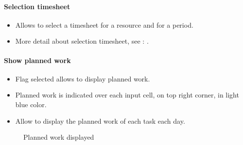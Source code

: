 \documentclass[letterpaper,10pt,english]{sphinxmanual}
\begin{document}
\paragraph{Selection timesheet}
\begin{itemize}
\item {} 
Allows to select a timesheet for a resource and for a period. 

\item {} 
More detail about selection timesheet, see : {\hyperref[RealWorkAllocation:rwa-selection-timesheet-label]{\emph{}}}.

\end{itemize}
\paragraph{Show planned work}
\begin{itemize}
\item {} 
Flag selected allows to display planned work. 

\item {} 
Planned work is indicated over each input cell, on top right corner, in light blue color.

\item {} 
Allow to display the planned work of each task each day.

\end{itemize}
\begin{figure}[htbp]
\centering
\capstart

\caption{Planned work displayed}\end{figure}
\end{document}
